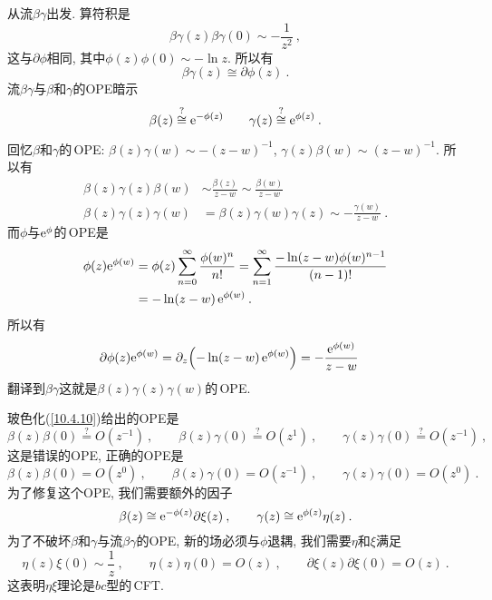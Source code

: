 从流$ \beta\gamma $出发. 算符积是
\begin{equation}
    \beta\gamma(z)\beta\gamma(0) \sim -\frac{1}{z^{2}} \:, \label{10.4.8}
\end{equation}
这与$ \partial\phi $相同, 其中$ \phi(z)\phi(0)\sim -\ln z$. 所以有
\begin{equation}
    \beta\gamma(z)\cong \partial\phi(z)\:. \label{10.4.9}
\end{equation}
流$ \beta\gamma $与$ \beta $和$ \gamma $的OPE暗示
\begin{equation}
    \beta(z)\overset{?}{\cong} \mathrm{e}^{-\phi(z)} \qquad
    \gamma(z)\overset{?}{\cong} \mathrm{e}^{\phi(z)} \:. \label{10.4.10}
\end{equation}
\begin{tcolorbox}
    回忆$ \beta $和$ \gamma $的\,OPE: $\beta(z)\gamma(w)\sim -(z-w)^{-1}$, $\gamma(z)\beta(w)\sim(z-w)^{-1}$. 所以有
    \begin{align*}
        \beta(z)\gamma(z)\beta(w)&\sim \frac{\beta(z)}{z-w} \sim \frac{\beta(w)}{z-w} \\
        \beta(z)\gamma(z)\gamma(w)&= \beta(z)\gamma(w)\gamma(z) \sim -\frac{\gamma(w)}{z-w} \:.
    \end{align*}
    而$ \phi $与$ \mathrm{e}^{\phi} $的\,OPE是
    \begin{align*}
        \phi(z)\mathrm{e}^{\phi(w)} &=\phi(z) \sum_{n=0}^{\infty}\frac{\phi(w)^{n}}{n!}=
        \sum_{n=1}^{\infty}\frac{-\ln(z-w)\phi(w)^{n-1}}{(n-1)!}\\
        &=-\ln(z-w)\,\mathrm{e}^{\phi(w)} \:.
    \end{align*}
    所以有
    \begin{align*}
       \partial\phi(z)\mathrm{e}^{\phi(w)}& =\partial_{z} \Bigl(-\ln(z-w)\,\mathrm{e}^{\phi(w)}\Bigr) = -\frac{\mathrm{e}^{\phi(w)}}{z-w}
    \end{align*}
    翻译到$ \beta\gamma $这就是$ \beta(z)\gamma(z)\gamma(w) $的\,OPE.
\end{tcolorbox}
\noindent 玻色化(\ref{10.4.10})给出的OPE是
\begin{equation}
    \beta(z)\beta(0) \overset{?}{=} O(z^{-1}) \:,\qquad 
    \beta(z)\gamma(0)\overset{?}{=} O(z^{1}) \:, \qquad
    \gamma(z)\gamma(0) \overset{?}{=} O(z^{-1}) \:, \label{10.4.11}
\end{equation}
这是错误的OPE, 正确的OPE是
\begin{equation}
    \beta(z)\beta(0) = O(z^{0}) \:,\qquad 
    \beta(z)\gamma(0)= O(z^{-1}) \:, \qquad
    \gamma(z)\gamma(0) = O(z^{0}) \:. \label{10.4.12}
\end{equation}
为了修复这个OPE, 我们需要额外的因子
\begin{equation}
    \beta(z)\cong \mathrm{e}^{-\phi(z)} \partial\xi(z) \:, \qquad \gamma(z)\cong\mathrm{e}^{\phi(z)}\eta(z)\:. \label{10.4.13}
\end{equation}
为了不破坏$\beta$和$\gamma$与流$\beta\gamma$的OPE, 新的场必须与$\phi$退耦, 我们需要$\eta$和$\xi$满足
\begin{equation}
    \eta(z)\xi(0) \sim \frac{1}{z} \:, \qquad 
    \eta(z)\eta(0) = O(z) \:, \qquad 
    \partial\xi(z)\partial\xi(0) =O(z) \:. \label{10.4.14}
\end{equation}
这表明$ \eta\xi $理论是$ bc $型的\,CFT.

